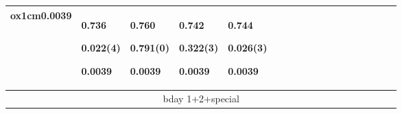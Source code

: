 \begin{longtable}{|p{0.01cm}|p{0.25cm}p{0.25cm}p{0.25cm}p{0.25cm}p{0.25cm}p{0.25cm}p{0.25cm}p{0.25cm}p{0.25cm}p{0.25cm}p{0.25cm}p{0.25cm}p{0.25cm}p{0.25cm}p{0.25cm}p{0.25cm}p{0.25cm}|}
ox{1cm}{\hspace{-0.17cm}0.0039}} & \par{\tiny \parbox{1cm}{\hspace{-0.17cm}0.736}}\par{\tiny \parbox{1cm}{\hspace{-0.17cm}0.022(4)}}\par{\tiny \parbox{1cm}{\hspace{-0.17cm}0.0039}} & \par{\tiny \parbox{1cm}{\hspace{-0.17cm}0.760}}\par{\tiny \parbox{1cm}{\hspace{-0.17cm}0.791(0)}}\par{\tiny \parbox{1cm}{\hspace{-0.17cm}0.0039}} & \par{\tiny \parbox{1cm}{\hspace{-0.17cm}0.742}}\par{\tiny \parbox{1cm}{\hspace{-0.17cm}0.322(3)}}\par{\tiny \parbox{1cm}{\hspace{-0.17cm}0.0039}} & \par{\tiny \parbox{1cm}{\hspace{-0.17cm}0.744}}\par{\tiny \parbox{1cm}{\hspace{-0.17cm}0.026(3)}}\par{\tiny \parbox{1cm}{\hspace{-0.17cm}0.0039}}\\
\hline\hline \multicolumn{18}{|c|}{\tiny{bday 1+2+special}} \\

\end{longtable}
